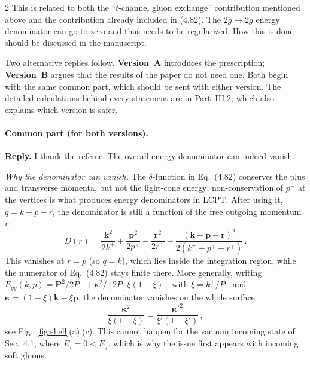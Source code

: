 \documentclass[11pt,a4paper]{article}
\newcommand{\bk}{\mathbf{k}}
\newcommand{\bp}{\mathbf{p}}
\newcommand{\br}{\mathbf{r}}
\begin{document}
\begin{referee}{2}
This is related to both the ``$t$-channel gluon exchange'' contribution mentioned above and the contribution already included in (4.82). The $2g\to2g$ energy denominator can go to zero and thus needs to be regularized. How this is done should be discussed in the manuscript.
\end{referee}

\begin{authornote}
Two alternative replies follow. \textbf{Version~A} introduces the prescription; \textbf{Version~B} argues that the results of the paper do not need one. Both begin with the same common part, which should be sent with either version. The detailed calculations behind every statement are in Part~III.2, which also explains which version is safer.
\end{authornote}

\paragraph{Common part (for both versions).}

\textbf{Reply.} I thank the referee. The overall energy denominator can indeed vanish.

\emph{Why the denominator can vanish.} The $\delta$-function in Eq.~(4.82) conserves the plus and transverse momenta, but not the light-cone energy; non-conservation of $p^-$ at the vertices is what produces energy denominators in LCPT. After using it, $q=k+p-r$, the denominator is still a function of the free outgoing momentum $r$:
\[
D(r)=\frac{\bk^2}{2k^+}+\frac{\bp^2}{2p^+}-\frac{\br^2}{2r^+}-\frac{(\bk+\bp-\br)^2}{2(k^++p^+-r^+)}\,.
\]
This vanishes at $r=p$ (so $q=k$), which lies inside the integration region, while the numerator of Eq.~(4.82) stays finite there. More generally, writing $E_{gg}(k,p)=\mathbf P^2/2P^+ + \boldsymbol\kappa^2/[2P^+\xi(1-\xi)]$ with $\xi=k^+/P^+$ and $\boldsymbol\kappa=(1-\xi)\bk-\xi\bp$, the denominator vanishes on the whole surface
\[
\frac{\boldsymbol\kappa^2}{\xi(1-\xi)}=\frac{\boldsymbol\kappa'^2}{\xi'(1-\xi')}\,,
\]
see Fig.~\ref{fig:shell}(a),(c). This cannot happen for the vacuum incoming state of Sec.~4.1, where $E_i=0<E_f$, which is why the issue first appears with incoming soft gluons.

\FigShell
\end{document}
